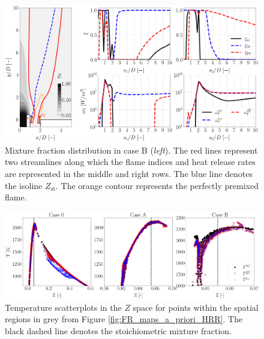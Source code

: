 \documentclass[preprint,12pt,authoryear]{elsarticle}
\begin{document}
{%

\begin{figure}[h!]
    \centering
	\includegraphics[scale=0.22]{./figures/FR_Z_streamlines_plots}
	\caption{Mixture fraction distribution in case B (\textsl{left}). The red lines represent two streamlines along which the flame indices and heat release rates are represented in the middle and right rows. The blue line denotes the isoline $Z_\mathrm{st}$. The orange contour represents the perfectly premixed flame.}
	\label{fig:FR_Z_streamlines_plots}
\end{figure}


\begin{figure}[h!]
    \centering
	\includegraphics[scale=0.2]{./figures/FR_scatterplots_a_priori}
	\caption{Temperature scatterplots in the $Z$ space for points within the spatial regions in grey from Figure \ref{fig:FR_maps_a_priori_HRR}. The black dashed line denotes the stoichiometric mixture fraction.}
	\label{fig:FR_scatterplots_a_priori}
\end{figure}

}
\end{document}
